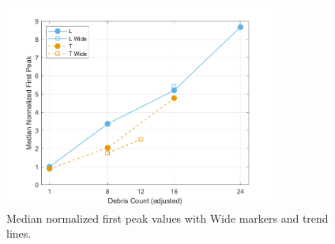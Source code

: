 \documentclass{article}
\begin{document}
\begin{figure}[htbp]
    \centering
    \includegraphics[width=0.8\textwidth]{FirstPeak_Regular_RemappedT_MediansTrend.png}
    \caption{Median normalized first peak values with Wide markers and trend lines.}
    \label{fig:firstpeak_medians_trend}
\end{figure}
\end{document}
